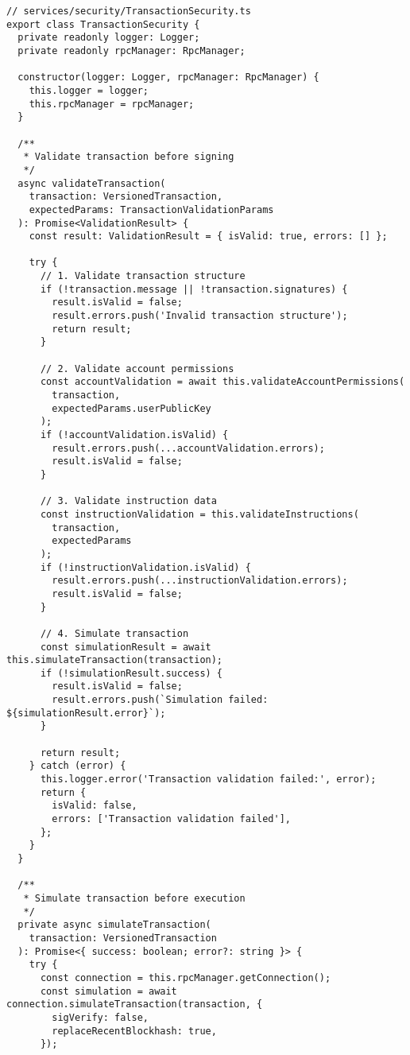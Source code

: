 \documentclass[11pt,a4paper]{article}
\begin{document}
\begin{lstlisting}[style=typescript, caption=Secure Transaction Handling]
// services/security/TransactionSecurity.ts
export class TransactionSecurity {
  private readonly logger: Logger;
  private readonly rpcManager: RpcManager;
  
  constructor(logger: Logger, rpcManager: RpcManager) {
    this.logger = logger;
    this.rpcManager = rpcManager;
  }
  
  /**
   * Validate transaction before signing
   */
  async validateTransaction(
    transaction: VersionedTransaction,
    expectedParams: TransactionValidationParams
  ): Promise<ValidationResult> {
    const result: ValidationResult = { isValid: true, errors: [] };
    
    try {
      // 1. Validate transaction structure
      if (!transaction.message || !transaction.signatures) {
        result.isValid = false;
        result.errors.push('Invalid transaction structure');
        return result;
      }
      
      // 2. Validate account permissions
      const accountValidation = await this.validateAccountPermissions(
        transaction,
        expectedParams.userPublicKey
      );
      if (!accountValidation.isValid) {
        result.errors.push(...accountValidation.errors);
        result.isValid = false;
      }
      
      // 3. Validate instruction data
      const instructionValidation = this.validateInstructions(
        transaction,
        expectedParams
      );
      if (!instructionValidation.isValid) {
        result.errors.push(...instructionValidation.errors);
        result.isValid = false;
      }
      
      // 4. Simulate transaction
      const simulationResult = await this.simulateTransaction(transaction);
      if (!simulationResult.success) {
        result.isValid = false;
        result.errors.push(`Simulation failed: ${simulationResult.error}`);
      }
      
      return result;
    } catch (error) {
      this.logger.error('Transaction validation failed:', error);
      return {
        isValid: false,
        errors: ['Transaction validation failed'],
      };
    }
  }
  
  /**
   * Simulate transaction before execution
   */
  private async simulateTransaction(
    transaction: VersionedTransaction
  ): Promise<{ success: boolean; error?: string }> {
    try {
      const connection = this.rpcManager.getConnection();
      const simulation = await connection.simulateTransaction(transaction, {
        sigVerify: false,
        replaceRecentBlockhash: true,
      });
      

\end{lstlisting}
\end{document}
